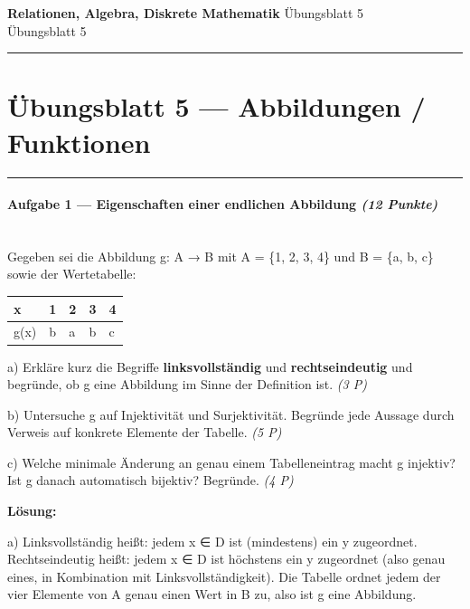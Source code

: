 \documentclass[11pt, a4paper]{article}
\providecommand{\nichttitle}{Übungsblatt}
\providecommand{\nichtsubtitle}{}
\renewcommand{\nichttitle}{Relationen, Algebra, Diskrete Mathematik}
\renewcommand{\nichtsubtitle}{Übungsblatt 5}
\begin{document}
\begin{center}
{\Large\bfseries\color{accent}\nichttitle}
\ifx\nichtsubtitle\empty\else
  \\[2pt]{\normalsize\color{accent!80!black}\nichtsubtitle}
\fi
\\[2pt]
\color{accent}\rule{0.4\linewidth}{0.8pt}\color{black}
\end{center}
\vspace{4pt}


\section{Übungsblatt 5 — Abbildungen / Funktionen}


\noindent\textcolor{rulegray}{\rule{\linewidth}{0.4pt}}


\paragraph{Aufgabe 1 — Eigenschaften einer endlichen Abbildung \textit{(12 Punkte)}}\mbox{}\\[2pt]

Gegeben sei die Abbildung g: A → B mit A = \{1, 2, 3, 4\} und B = \{a, b, c\} sowie der Wertetabelle:



{\small
\begin{tabularx}{\linewidth}{XXXXX}
\hline
\rowcolor{tableheadbg}
{\color{white}\textbf{x}} & {\color{white}\textbf{1}} & {\color{white}\textbf{2}} & {\color{white}\textbf{3}} & {\color{white}\textbf{4}} \\[2pt]
\hline
\endhead
\hline
\endfoot
g(x) & b & a & b & c \\
\end{tabularx}
}


a) Erkläre kurz die Begriffe \textbf{linksvollständig} und \textbf{rechtseindeutig} und begründe, ob g eine Abbildung im Sinne der Definition ist. \textit{(3 P)}


b) Untersuche g auf Injektivität und Surjektivität. Begründe jede Aussage durch Verweis auf konkrete Elemente der Tabelle. \textit{(5 P)}


c) Welche minimale Änderung an genau einem Tabelleneintrag macht g injektiv? Ist g danach automatisch bijektiv? Begründe. \textit{(4 P)}


\textbf{Lösung:}


a) Linksvollständig heißt: jedem x ∈ D ist (mindestens) ein y zugeordnet. Rechtseindeutig heißt: jedem x ∈ D ist höchstens ein y zugeordnet (also genau eines, in Kombination mit Linksvollständigkeit). Die Tabelle ordnet jedem der vier Elemente von A genau einen Wert in B zu, also ist g eine Abbildung.
\end{document}
